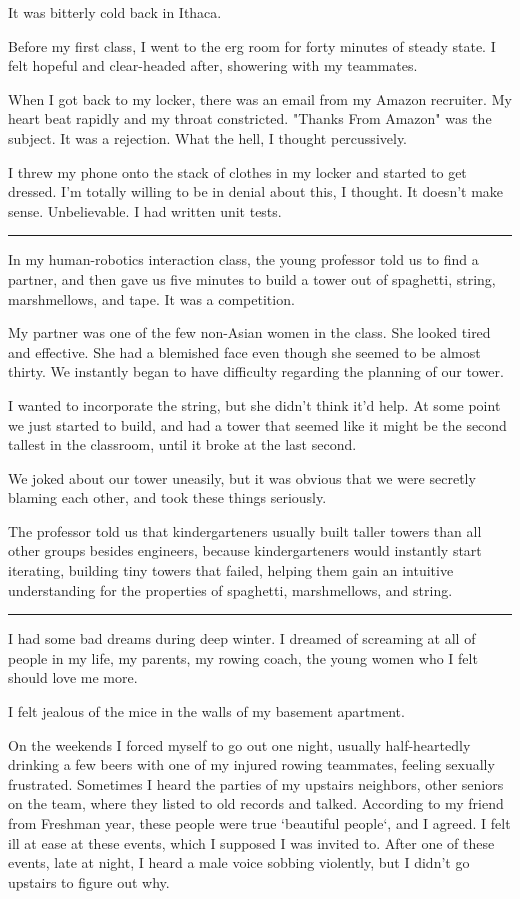 It was bitterly cold back in Ithaca.

Before my first class, I went to the erg room for forty minutes of steady state.
I felt hopeful and clear-headed after, showering with my teammates.

When I got back to my locker, there was an email from my Amazon recruiter.  My
heart beat rapidly and my throat constricted.  "Thanks From Amazon" was the
subject.  It was a rejection.  What the hell, I thought percussively. 

I threw my phone onto the stack of clothes in my locker and started to get
dressed.  I'm totally willing to be in denial about this, I thought.  It doesn't
make sense.  Unbelievable.  I had written unit tests.

\plainfancybreak{12pt}{2}{* * *}

In my human-robotics interaction class, the young professor told us to find a
partner, and then gave us five minutes to build a tower out of spaghetti,
string, marshmellows, and tape.  It was a competition.

My partner was one of the few non-Asian women in the class.  She looked tired
and effective.  She had a blemished face even though she seemed to be almost
thirty.  We instantly began to have difficulty regarding the planning of our
tower.  

I wanted to incorporate the string, but she didn't think it'd help.  At some
point we just started to build, and had a tower that seemed like it might be the
second tallest in the classroom, until it broke at the last second.

We joked about our tower uneasily, but it was obvious that we were secretly
blaming each other, and took these things seriously.

The professor told us that kindergarteners usually built taller towers than all
other groups besides engineers, because kindergarteners would instantly start
iterating, building tiny towers that failed, helping them gain an intuitive
understanding for the properties of spaghetti, marshmellows, and string. 

\plainfancybreak{12pt}{2}{* * *}

I had some bad dreams during deep winter.  I dreamed of screaming at all of
people in my life, my parents, my rowing coach, the young women who I felt
should love me more.  

I felt jealous of the mice in the walls of my basement apartment.

On the weekends I forced myself to go out one night, usually half-heartedly
drinking a few beers with one of my injured rowing teammates, feeling sexually
frustrated.  Sometimes I heard the parties of my upstairs neighbors, other
seniors on the team, where they listed to old records and talked.  According to
my friend from Freshman year, these people were true `beautiful people`, and I
agreed.  I felt ill at ease at these events, which I supposed I was invited to.
After one of these events, late at night, I heard a male voice sobbing
violently, but I didn't go upstairs to figure out why.

